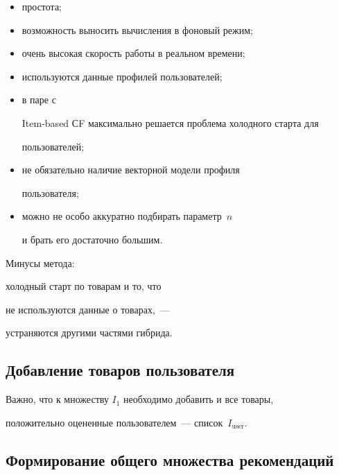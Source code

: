 \begin{itemize} 


\item простота;


    \item возможность выносить вычисления в фоновый режим;


\item очень высокая скорость работы в реальном времени; 


\item


используются данные профилей пользователей; 


\item в паре с


Item-based СF максимально решается проблема холодного старта для


пользователей; 


\item не обязательно наличие векторной модели профиля


пользователя; 


\item можно не особо аккуратно подбирать параметр~$n$


и брать его достаточно большим.


\end{itemize}





Минусы метода:


холодный старт по товарам и то, что


не используются данные о товарах,~---


устраняются другими частями гибрида.





\subsection{Добавление товаров пользователя}





Важно, что к множеству $I_1$ необходимо добавить и все товары,


положительно оцененные пользователем~--- спи\-сок~$I_{\mathrm{user}}$.





\subsection{Формирование общего множества рекомендаций}





